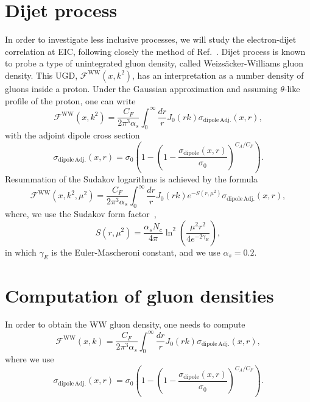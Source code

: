 \documentclass{article}
\newcommand{\fww}[0]{\mathcal{F}^{\mathrm{WW}}}
\newcommand{\sdp}[0]{\sigma_{\mathrm{dipole}}}
\newcommand{\sdpa}[0]{\sigma_{\mathrm{dipole\,Adj.}}}
\begin{document}
\section{Dijet process}
In order to investigate less inclusive processes, we will study the electron-dijet correlation at EIC, following closely the method of Ref.~\cite{vanHameren:2021sqc}. 
Dijet process is known to probe a type of unintegrated gluon density, called Weizs\"acker-Williams gluon density\cite{}.
This UGD, $\fww(x,k^2)$, has an interpretation as a number density of gluons inside a proton. Under the Gaussian approximation and assuming $\theta$-like profile of the proton, one can write  
\begin{equation}
\fww(x,k^2)= \frac{C_F}{2\pi^3\alpha_s}\int^\infty_0\frac{dr}{r}J_0(r k) \sdpa(x,r),
\end{equation} 	
with the adjoint dipole cross section
\begin{equation}
\sdpa(x,r)=\sigma_0\left( 1-\left(1-\frac{\sdp(x,r)}{\sigma_0}\right)^{C_A/C_F}\right).
\end{equation}
Resummation of the Sudakov logarithms is achieved by the formula~\cite{}
\begin{equation}
	\fww(x,k^2,\mu^2)= \frac{C_F}{2\pi^3\alpha_s}\int^\infty_0\frac{dr}{r}J_0(r k) e^{-S(r,\mu^2)} \sdpa(x,r),
\end{equation}
where, we use the Sudakov form factor~\cite{},
\begin{equation}
	S(r,\mu^2)=\frac{\alpha_s N_c}{4\pi}\ln^2\left(\frac{\mu^2r^2}{4e^{-2\gamma_E}}\right),
\end{equation}
in which $\gamma_E$ is the Euler-Mascheroni constant, and we use $\alpha_s=0.2$. 



	
	
	
\appendix	
\section{Computation of gluon densities}
In order to obtain the WW gluon density, one needs to compute 
\begin{equation}
	\fww(x,k)= \frac{C_F}{2\pi^3\alpha_s}\int^\infty_0\frac{dr}{r}J_0(r k) \sdpa(x,r),
\end{equation} 	
where we use 
\begin{equation}
	\sdpa(x,r)=\sigma_0\left( 1-\left(1-\frac{\sdp(x,r)}{\sigma_0}\right)^{C_A/C_F}\right).
\end{equation}
\end{document}
